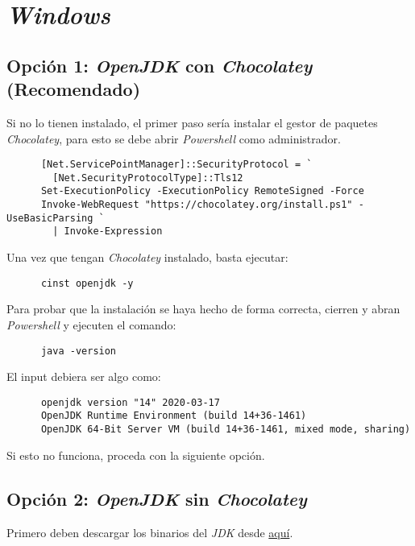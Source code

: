 \section{\textit{Windows}}
  \subsection{Opción 1: \textit{OpenJDK} con \textit{Chocolatey} (Recomendado)}
    Si no lo tienen instalado, el primer paso sería instalar el gestor de paquetes 
    \textit{Chocolatey}, para esto se debe abrir \textit{Powershell} como 
    administrador.

    \begin{verbatim}
      [Net.ServicePointManager]::SecurityProtocol = `
        [Net.SecurityProtocolType]::Tls12
      Set-ExecutionPolicy -ExecutionPolicy RemoteSigned -Force
      Invoke-WebRequest "https://chocolatey.org/install.ps1" -UseBasicParsing `
        | Invoke-Expression
    \end{verbatim}

    Una vez que tengan \textit{Chocolatey} instalado, basta ejecutar:

    \begin{verbatim}
      cinst openjdk -y
    \end{verbatim}

    Para probar que la instalación se haya hecho de forma correcta, cierren y abran 
    \textit{Powershell} y ejecuten el comando:

    \begin{verbatim}
      java -version
    \end{verbatim}

    El input debiera ser algo como:

    \begin{verbatim}
      openjdk version "14" 2020-03-17
      OpenJDK Runtime Environment (build 14+36-1461)
      OpenJDK 64-Bit Server VM (build 14+36-1461, mixed mode, sharing)
    \end{verbatim}

    Si esto no funciona, proceda con la siguiente opción.

  \subsection{Opción 2: \textit{OpenJDK} sin \textit{Chocolatey}}
    Primero deben descargar los binarios del \textit{JDK} desde 
    \href{
      https://download.java.net/java/GA/jdk14/076bab302c7b4508975440c56f6cc26a/36/GPL/openjdk-14_windows-x64_bin.zip
      }{aquí}.
    
